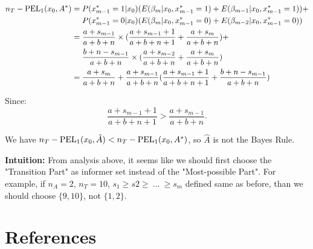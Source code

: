 \documentclass[12pt]{article}
\begin{document}
\begin{align*}
    n_T - {\rm PEL}_1(x_0, A^*) &= P(x_{m-1}^* = 1|x_0)(E(\beta_m|x_0,x_{m-1}^* = 1) + E(\beta_{m-1}|x_0, x_{m-1}^* = 1)) +\\ &~~~~P(x_{m-1}^* = 0|x_0)(E(\beta_m|x_0,x_{m-1}^* = 0) + E(\beta_{m-2}|x_0, x_{m-1}^* = 0))\\
    &= \frac{a+s_{m-1}}{a+b+n}\times (\frac{a+s_{m-1}+1}{a+b+n+1} + \frac{a+s_m}{a+b+n})+\\ &~~~~\frac{b+n-s_{m-1}}{a+b+n}\times(\frac{a+s_{m-2}}{a+b+n} + \frac{a+s_m}{a+b+n})\\
    &= \frac{a + s_m}{a+b+n} + \frac{a+s_{m-1}}{a+b+n}(\frac{a+s_{m-1}+ 1}{a+b+n+1} + \frac{b+n-s_{m-1}}{a+b+n})
\end{align*}

Since:
$$
\frac{a+s_{m-1}+1}{a+b+n+1} > \frac{a+s_{m-1}}{a+b+n}.
$$

We have 
$n_T - {\rm PEL}_1(x_0, \hat{A}) <n_T - {\rm PEL}_1(x_0, A^*)$, 
so $\hat{A}$ is not the Bayes Rule.

\textbf{Intuition:} From analysis above, it seems like we should first choose the "Transition Part" as informer set instead of the "Most-possible Part". For example, if $n_A = 2$, $n_T = 10$, $s_1 \geq s2 \geq ~...~\geq s_m$ defined same as before, than we should choose $\{9, 10\}$, not $\{1, 2\}$.

\onehalfspacing









\section*{References}
\end{document}
